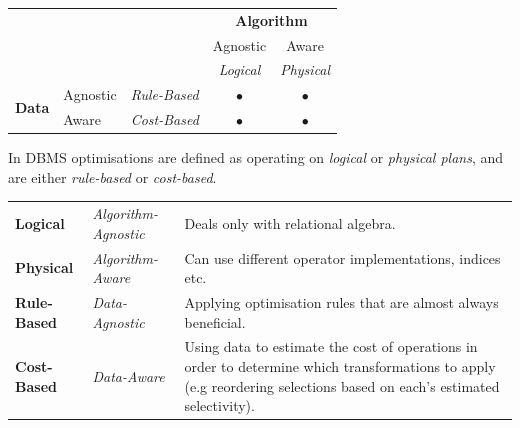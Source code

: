 \begin{center}
    \begin{tabular}{l l l c c}
                                        &          &                     &\multicolumn{2}{c}{\textbf{Algorithm}} \\
                                        &          &                     & Agnostic          & Aware             \\
                                        &          &                     & \textit{Logical}  & \textit{Physical} \\
        \multirow{2}{*}{\textbf{Data}}  & Agnostic & \textit{Rule-Based} & $\bullet$         & $\bullet$         \\
                                        & Aware    & \textit{Cost-Based} & $\bullet$         & $\bullet$         \\
    \end{tabular}
\end{center}
In DBMS optimisations are defined as operating on \textit{logical} or \textit{physical plans}, and are either \textit{rule-based} or \textit{cost-based}.
\begin{center}
    \begin{tabular}{l l p{}}
        \textbf{Logical} & \textit{Algorithm-Agnostic} & Deals only with relational algebra. \\
        \textbf{Physical} & \textit{Algorithm-Aware} & Can use different operator implementations, indices etc. \\
        \textbf{Rule-Based} & \textit{Data-Agnostic} & Applying optimisation rules that are almost always beneficial. \\
        \textbf{Cost-Based} & \textit{Data-Aware} & Using data to estimate the cost of operations in order to determine which transformations to apply (e.g reordering selections based on each's estimated selectivity). \\
    \end{tabular}
\end{center}


